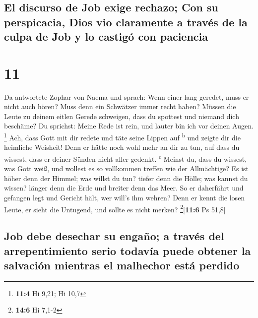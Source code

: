 \hypertarget{el-discurso-de-job-exige-rechazo-con-su-perspicacia-dios-vio-claramente-a-travuxe9s-de-la-culpa-de-job-y-lo-castiguxf3-con-paciencia}{%
\subsection{El discurso de Job exige rechazo; Con su perspicacia, Dios
vio claramente a través de la culpa de Job y lo castigó con
paciencia}\label{el-discurso-de-job-exige-rechazo-con-su-perspicacia-dios-vio-claramente-a-travuxe9s-de-la-culpa-de-job-y-lo-castiguxf3-con-paciencia}}

\hypertarget{section-10}{%
\section{11}\label{section-10}}

 Da antwortete Zophar von Naema und sprach: 
Wenn einer lang geredet, muss er nicht auch hören? Muss denn ein
Schwätzer immer recht haben?  Müssen die Leute zu deinem
eitlen Gerede schweigen, dass du spottest und niemand dich beschäme?
 Du sprichst: Meine Rede ist rein, und lauter bin ich vor
deinen Augen. \footnote{\textbf{11:4} Hi 9,21; Hi 10,7} 
Ach, dass Gott mit dir redete und täte seine Lippen auf
\textsuperscript{b}  und zeigte dir die heimliche
Weisheit! Denn er hätte noch wohl mehr an dir zu tun, auf dass du
wissest, dass er deiner Sünden nicht aller gedenkt. \textsuperscript{c}
 Meinst du, dass du wissest, was Gott weiß, und wollest es
so vollkommen treffen wie der Allmächtige?  Es ist höher
denn der Himmel; was willst du tun? tiefer denn die Hölle; was kannst du
wissen?  länger denn die Erde und breiter denn das Meer.
 So er daherfährt und gefangen legt und Gericht hält, wer
will's ihm wehren?  Denn er kennt die losen Leute, er
sieht die Untugend, und sollte es nicht merken?
\footnote{\textbf{14:6} Hi 7,1-2}{[}\textbf{11:6} Ps 51,8{]}

\hypertarget{job-debe-desechar-su-engauxf1o-a-travuxe9s-del-arrepentimiento-serio-todavuxeda-puede-obtener-la-salvaciuxf3n-mientras-el-malhechor-estuxe1-perdido}{%
\subsection{Job debe desechar su engaño; a través del arrepentimiento
serio todavía puede obtener la salvación mientras el malhechor está
perdido}\label{job-debe-desechar-su-engauxf1o-a-travuxe9s-del-arrepentimiento-serio-todavuxeda-puede-obtener-la-salvaciuxf3n-mientras-el-malhechor-estuxe1-perdido}}

